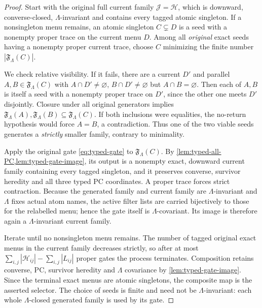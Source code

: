 \begin{proof}
Start with the original full current family $\mathcal J=\mathcal H$,
which is downward, converse-closed, $\Lambda$-invariant and
contains every tagged atomic singleton.  If a nonsingleton menu
remains, an atomic singleton $C\subsetneq D$ is a seed with a
nonempty proper trace on the current menu $D$.  Among all
\emph{original} exact seeds having a nonempty proper current trace,
choose $C$ minimizing the finite number $|\mathfrak F_\Lambda(C)|$.

We check relative visibility.  If it fails, there are a current
$D'$ and parallel $A,B\in\mathfrak F_\Lambda(C)$ with
$A\cap D'\ne\varnothing$, $B\cap D'\ne\varnothing$ but
$A\cap B=\varnothing$.  Then each of $A,B$ is itself a seed
with a nonempty proper trace on $D'$, since the other one meets
$D'$ disjointly.  Closure under all original generators implies
$\mathfrak F_\Lambda(A),\mathfrak F_\Lambda(B)
\subseteq\mathfrak F_\Lambda(C)$.  If both inclusions were
equalities, the no-return hypothesis would force $A=B$, a
contradiction.  Thus one of the two viable seeds generates a
\emph{strictly} smaller family, contrary to minimality.

Apply the original gate \eqref{eq:typed-gate} to
$\mathfrak F_\Lambda(C)$.  By
\cref{lem:typed-all-PC,lem:typed-gate-image}, its output is a
nonempty exact, downward current family containing every tagged
singleton, and it preserves converse, survivor heredity and all
three typed PC coordinates.  A proper trace forces strict
contraction.  Because the generated family and current family
are $\Lambda$-invariant and $\Lambda$ fixes actual atom names,
the active filter lists are carried bijectively to those for the
relabelled menu; hence the gate itself is $\Lambda$-covariant.
Its image is therefore again a $\Lambda$-invariant current family.

Iterate until no nonsingleton menu remains.  The number of tagged
original exact menus in the current family decreases strictly,
so after at most
$\sum_{i,j}|\mathcal H_{ij}|-\sum_{i,j}|L_{ij}|$
proper gates the process terminates.  Composition retains
converse, PC, survivor heredity and $\Lambda$ covariance by
\cref{lem:typed-gate-image}.  Since the terminal exact menus are
atomic singletons, the composite map is the asserted selector.
The choice of seeds is finite and need not be $\Lambda$-invariant:
each whole $\Lambda$-closed generated family is used by its gate.
\end{proof}

